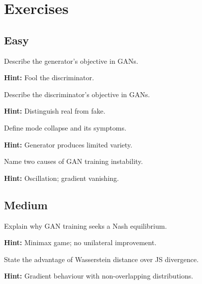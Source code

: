 
\section*{Exercises}

\subsection*{Easy}

\begin{problem}
Describe the generator's objective in GANs.

\textbf{Hint:} Fool the discriminator.
\end{problem}

\begin{problem}
Describe the discriminator's objective in GANs.

\textbf{Hint:} Distinguish real from fake.
\end{problem}

\begin{problem}
Define mode collapse and its symptoms.

\textbf{Hint:} Generator produces limited variety.
\end{problem}

\begin{problem}
Name two causes of GAN training instability.

\textbf{Hint:} Oscillation; gradient vanishing.
\end{problem}

\subsection*{Medium}

\begin{problem}
Explain why GAN training seeks a Nash equilibrium.

\textbf{Hint:} Minimax game; no unilateral improvement.
\end{problem}

\begin{problem}
State the advantage of Wasserstein distance over JS divergence.

\textbf{Hint:} Gradient behaviour with non-overlapping distributions.
\end{problem}

